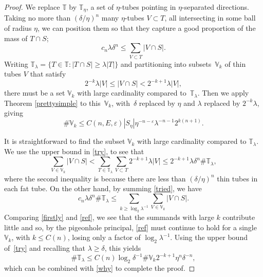 \documentclass[letterpaper, reqno, 11pt]{amsart}
\theoremstyle{remark}
\numberwithin{equation}{section}
\begin{document}
\begin{proof}  We replace $\mathbb{T}$ by $\mathbb{T}_{\eta}$, a set of $\eta$-tubes pointing in $\eta$-separated directions. Taking no more than $(\delta/\eta)^n$  many $\eta$-tubes $V\subset T$, all intersecting in some ball of radius $\eta$, we can position them so that they capture a good proportion of the mass of $T\cap S$;  
\begin{equation}\label{tried}
c_n\lambda \delta^{n}\le \sum_{V\subset T} |V\cap S|.
\end{equation}
Writing $\mathbb{T}_\lambda=\{ T \in \mathbb{T} :  |T \cap S| \geq \lambda |T| \}$ and partitioning  into subsets~$\mathbb{V}_{\! k}$ of thin tubes $V$ that satisfy
\begin{equation}\label{try}
2^{-k}\lambda|V|\le |V \cap S| < 2^{-k+1}\lambda|V|,
\end{equation}
there must be a set $\mathbb{V}_{\! k}$ with large cardinality compared to~$\mathbb{T}_\lambda$.  Then we apply Theorem \ref{prettysimple} to this~$\mathbb{V}_{\!k}$, with~$\delta$ replaced
by $\eta$ and $\lambda$ replaced by $2^{-k}\lambda$, giving 
\begin{equation}\label{why}
\#\mathbb{V}_{\!k} \le C(n,E,\varepsilon) |S_\eta| \eta^{-n-\varepsilon} \lambda^{-n-1}2^{k(n+1)}.
\end{equation}

It is straightforward to find the subset  $\mathbb{V}_{\! k}$ with large cardinality compared to $\mathbb{T}_\lambda$.  We use the upper bound in \eqref{try}, to see that
\begin{equation}\label{firstly}\sum_{V\in \mathbb{V}_{\!k}} |V\cap S|< \sum_{T\in\mathbb{T}_\lambda}\sum_{V\subset T}2^{-k+1}\lambda|V|\le  2^{-k+1}\lambda\delta^n\#\mathbb{T}_\lambda,
\end{equation}
where the second inequality is because there are less than $(\delta/\eta)^n$ thin tubes in each fat tube. 
On the other hand, by summing \eqref{tried}, we have \begin{equation}\label{ref}
c_n\lambda \delta^n\#\mathbb{T}_\lambda\le \sum_{k\ge \log_2\lambda^{-1}} \sum_{V\in \mathbb{V}_{\!k}} |V\cap S|.\end{equation}
Comparing \eqref{firstly} and \eqref{ref}, we see that the summands with large $k$ contribute little and so, by the pigeonhole principal, \eqref{ref} must continue to hold for a single $\mathbb{V}_k$, with $k\le C(n)$,  losing only a factor of $\log_2\lambda^{-1}$. Using the upper bound of~\eqref{try} and recalling that $\lambda\ge \delta$, this yields
 \begin{equation*}\label{this}\#\mathbb{T}_\lambda\le C(n)\log_2\delta^{-1}\#\mathbb{V}_{\!k}2^{-k+1} \eta^{n}\delta^{-n},\end{equation*}
which can be combined with \eqref{why} to complete the proof.
\end{proof}
\end{document}
